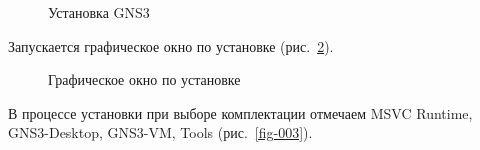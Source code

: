 \documentclass[
  english,
  russian,
  12pt,
  a4paper,
  DIV=11,
  numbers=noendperiod]{scrreprt}
\begin{document}
\begin{figure}


\caption{\label{fig-001}Установка GNS3}

\end{figure}%

Запускается графическое окно по установке (рис.~\ref{fig-002}).

\begin{figure}


\caption{\label{fig-002}Графическое окно по установке}

\end{figure}%

В процессе установки при выборе комплектации отмечаем MSVC Runtime,
GNS3-Desktop, GNS3-VM, Tools (рис.~\ref{fig-003}).
\end{document}
